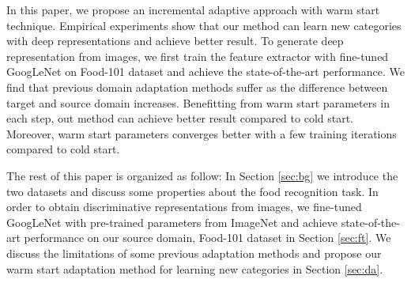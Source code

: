 In this paper, we propose an incremental adaptive approach with warm start technique. Empirical experiments show that our method can learn new categories with deep representations and achieve better result. To generate deep representation from images, we first train the feature extractor with fine-tuned GoogLeNet on Food-101 dataset and achieve the state-of-the-art performance.
We find that previous domain adaptation methods suffer as the difference between target and source domain increases. Benefitting from warm start parameters in each step, out method can achieve better result compared to cold start. Moreover, warm start parameters converges better with a few training iterations compared to cold start.

The rest of this paper is organized as follow: In Section \ref{sec:bg} we introduce the two datasets and discuss some properties about the food recognition task. In order to obtain discriminative representations from images, we fine-tuned GoogLeNet with pre-trained parameters from ImageNet and achieve state-of-the-art performance on our source domain, Food-101 dataset in Section \ref{sec:ft}. We discuss the limitations of some previous adaptation methods and propose our warm start adaptation method for learning new categories in Section \ref{sec:da}.

